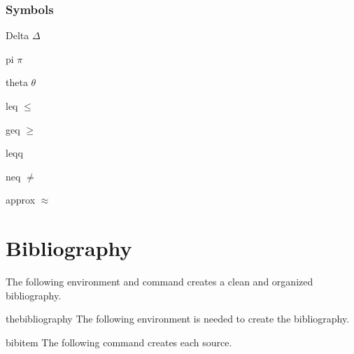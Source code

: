 \documentclass[12pt,hidelinks]{article}
\begin{document}
	\subsubsection{Symbols}
		\begin{docCommand}{Delta}{}
			$\Delta$
		\end{docCommand}
		\begin{docCommand}{pi}{}
			$\pi$
		\end{docCommand}	
		\begin{docCommand}{theta}{}
			$\theta$
		\end{docCommand}
		\begin{docCommand}{leq}{}
			$\leq$
		\end{docCommand}
		\begin{docCommand}{geq}{}
			$\geq$
		\end{docCommand}
		\begin{docCommand}{leqq}{}
			
		\end{docCommand}	
		\begin{docCommand}{neq}{}
			$\neq$
		\end{docCommand}
		\begin{docCommand}{approx}{}
			$\approx$
		\end{docCommand}
\newpage
\section{Bibliography}
\vspace{10.5cm}
The following environment and command creates a clean and organized bibliography.
	\begin{docEnvironment}{thebibliography}{}
			The following environment is needed to create the bibliography.
	\end{docEnvironment}
	\begin{docCommand}{bibitem}{}
			The following command creates each source.
	\end{docCommand}
\end{document}
